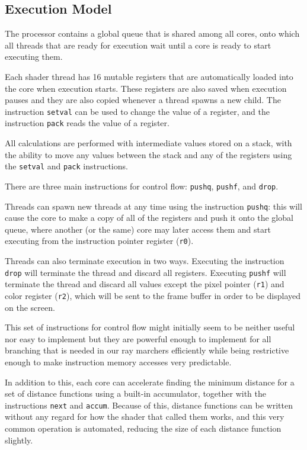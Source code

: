 		\subsection{Execution Model}

			The processor contains a global queue that is shared among all
			cores, onto which all threads that are ready for execution wait
			until a core is ready to start executing them.

			Each shader thread has 16 mutable registers that are automatically
			loaded into the core when execution starts. These registers are
			also saved when execution pauses and they are also copied whenever
			a thread spawns a new child. The instruction \texttt{setval} can be
			used to change the value of a register, and the instruction
			\texttt{pack} reads the value of a register.

			All calculations are performed with intermediate values stored on a
			stack, with the ability to move any values between the stack and
			any of the registers using the \texttt{setval} and \texttt{pack}
			instructions.

			There are three main instructions for control flow: \texttt{pushq},
			\texttt{pushf}, and \texttt{drop}. 

			Threads can spawn new threads at any time using the instruction
			\texttt{pushq}: this will cause the core to make a copy of all of
			the registers and push it onto the global queue, where another (or
			the same) core may later access them and start executing from the
			instruction pointer register (\texttt{r0}).

			Threads can also terminate execution in two ways. Executing the
			instruction \texttt{drop} will terminate the thread and discard all
			registers. Executing \texttt{pushf} will terminate the thread and
			discard all values except the pixel pointer (\texttt{r1}) and color
			register (\texttt{r2}), which will be sent to the frame buffer in
			order to be displayed on the screen.

			This set of instructions for control flow might initially seem to
			be neither useful nor easy to implement but they are powerful
			enough to implement for all branching that is needed in our ray
			marchers efficiently while being restrictive enough to make
			instruction memory accesses very predictable.

			In addition to this, each core can accelerate finding the minimum 
			distance for a set of distance functions using a built-in 
			accumulator, together with the instructions \texttt{next} and 
			\texttt{accum}. Because of this, distance functions can be written
			without any regard for how the shader that called them works, and
			this very common operation is automated, reducing the size of each
			distance function slightly.

